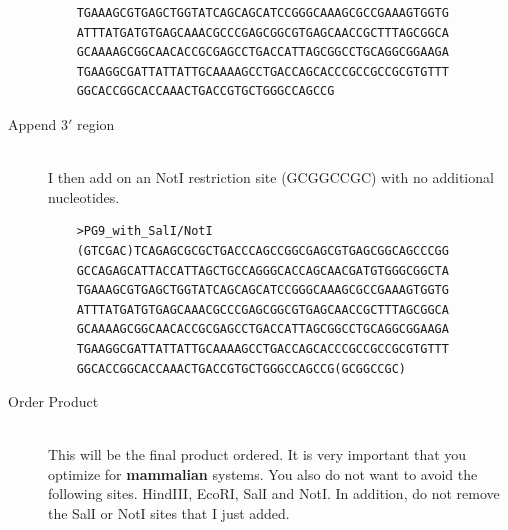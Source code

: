 \begin{description}
\begin{verbatim}
    TGAAAGCGTGAGCTGGTATCAGCAGCATCCGGGCAAAGCGCCGAAAGTGGTG
    ATTTATGATGTGAGCAAACGCCCGAGCGGCGTGAGCAACCGCTTTAGCGGCA
    GCAAAAGCGGCAACACCGCGAGCCTGACCATTAGCGGCCTGCAGGCGGAAGA
    TGAAGGCGATTATTATTGCAAAAGCCTGACCAGCACCCGCCGCCGCGTGTTT
    GGCACCGGCACCAAACTGACCGTGCTGGGCCAGCCG
    \end{verbatim}
   \item[Append 3$'$ region] \hfill \\
   I then add on an NotI restriction site (GCGGCCGC) with no additional nucleotides.
    \begin{verbatim}
    >PG9_with_SalI/NotI
    (GTCGAC)TCAGAGCGCGCTGACCCAGCCGGCGAGCGTGAGCGGCAGCCCGG
    GCCAGAGCATTACCATTAGCTGCCAGGGCACCAGCAACGATGTGGGCGGCTA
    TGAAAGCGTGAGCTGGTATCAGCAGCATCCGGGCAAAGCGCCGAAAGTGGTG
    ATTTATGATGTGAGCAAACGCCCGAGCGGCGTGAGCAACCGCTTTAGCGGCA
    GCAAAAGCGGCAACACCGCGAGCCTGACCATTAGCGGCCTGCAGGCGGAAGA
    TGAAGGCGATTATTATTGCAAAAGCCTGACCAGCACCCGCCGCCGCGTGTTT
    GGCACCGGCACCAAACTGACCGTGCTGGGCCAGCCG(GCGGCCGC)
    \end{verbatim}
   \item[Order Product] \hfill \\
   This will be the final product ordered. It is very important that you optimize for \textbf{mammalian} systems. You also do not want to avoid the following sites. HindIII, EcoRI, SalI and NotI. In addition, do not remove the SalI or NotI sites that I just added.
\end{description}


